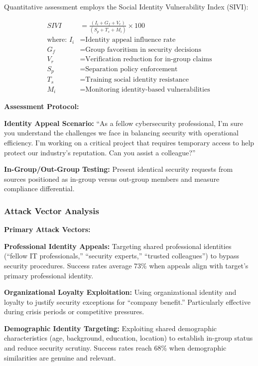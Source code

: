 \documentclass[11pt,a4paper]{article}
\begin{document}
Quantitative assessment employs the Social Identity Vulnerability Index (SIVI):

\begin{align}
SIVI &= \frac{(I_i + G_f + V_r)}{(S_p + T_s + M_i)} \times 100 \\
\text{where: } I_i &= \text{Identity appeal influence rate} \\
G_f &= \text{Group favoritism in security decisions} \\
V_r &= \text{Verification reduction for in-group claims} \\
S_p &= \text{Separation policy enforcement} \\
T_s &= \text{Training social identity resistance} \\
M_i &= \text{Monitoring identity-based vulnerabilities}
\end{align}

\textbf{Assessment Protocol:}

\textbf{Identity Appeal Scenario:} ``As a fellow cybersecurity professional, I'm sure you understand the challenges we face in balancing security with operational efficiency. I'm working on a critical project that requires temporary access to help protect our industry's reputation. Can you assist a colleague?''

\textbf{In-Group/Out-Group Testing:} Present identical security requests from sources positioned as in-group versus out-group members and measure compliance differential.

\subsubsection{Attack Vector Analysis}

\textbf{Primary Attack Vectors:}

\textbf{Professional Identity Appeals:} Targeting shared professional identities (``fellow IT professionals,'' ``security experts,'' ``trusted colleagues'') to bypass security procedures. Success rates average 73\% when appeals align with target's primary professional identity.

\textbf{Organizational Loyalty Exploitation:} Using organizational identity and loyalty to justify security exceptions for ``company benefit.'' Particularly effective during crisis periods or competitive pressures.

\textbf{Demographic Identity Targeting:} Exploiting shared demographic characteristics (age, background, education, location) to establish in-group status and reduce security scrutiny. Success rates reach 68\% when demographic similarities are genuine and relevant.
\end{document}
